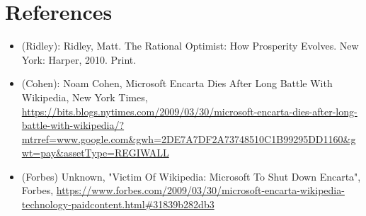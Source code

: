 \section*{References}

\begin{itemize}

\item (Ridley): Ridley, Matt. The Rational Optimist: How Prosperity Evolves. New York: Harper, 2010. Print.

\item (Cohen): Noam Cohen, Microsoft Encarta Dies After Long Battle With Wikipedia, New York Times, \url{https://bits.blogs.nytimes.com/2009/03/30/microsoft-encarta-dies-after-long-battle-with-wikipedia/?mtrref=www.google.com&gwh=2DE7A7DF2A73748510C1B99295DD1160&gwt=pay&assetType=REGIWALL}

\item (Forbes) Unknown, "Victim Of Wikipedia: Microsoft To Shut Down Encarta", Forbes, \url{https://www.forbes.com/2009/03/30/microsoft-encarta-wikipedia-technology-paidcontent.html#31839b282db3}

\end{itemize}
